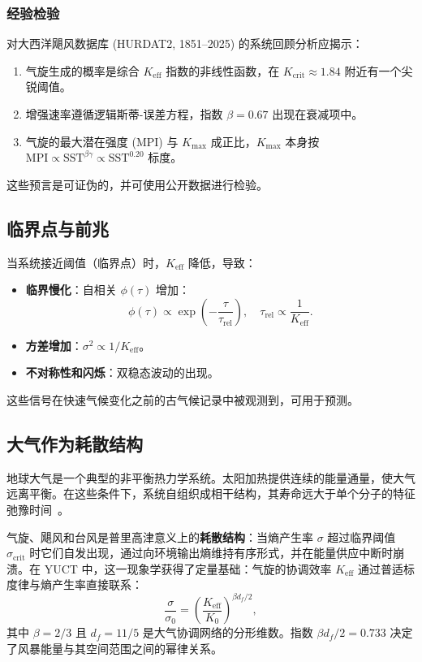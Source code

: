 \documentclass[12pt,a4paper]{article}
\newcommand{\Keff}{K_{\mathrm{eff}}}
\begin{document}
	\subsubsection*{经验检验}
	
	对大西洋飓风数据库 (HURDAT2, 1851--2025) 的系统回顾分析应揭示：
	\begin{enumerate}
		\item 气旋生成的概率是综合 $\Keff$ 指数的非线性函数，在 $K_{\mathrm{crit}} \approx 1.84$ 附近有一个尖锐阈值。
		\item 增强速率遵循逻辑斯蒂-误差方程，指数 $\beta = 0.67$ 出现在衰减项中。
		\item 气旋的最大潜在强度 (MPI) 与 $K_{\mathrm{max}}$ 成正比，$K_{\mathrm{max}}$ 本身按 $\mathrm{MPI} \propto \mathrm{SST}^{\beta\gamma} \propto \mathrm{SST}^{0.20}$ 标度。
	\end{enumerate}
	这些预言是可证伪的，并可使用公开数据进行检验。
	
	\subsection{临界点与前兆}
	
	当系统接近阈值（临界点）时，\(\Keff\) 降低，导致：
	\begin{itemize}
		\item \textbf{临界慢化}：自相关 \(\phi(\tau)\) 增加：
		\[
		\phi(\tau) \propto \exp\!\left(-\frac{\tau}{\tau_{\text{rel}}}\right),\quad \tau_{\text{rel}} \propto \frac{1}{\Keff}.
		\]
		\item \textbf{方差增加}：\(\sigma^2 \propto 1/\Keff\)。
		\item \textbf{不对称性和闪烁}：双稳态波动的出现。
	\end{itemize}
	这些信号在快速气候变化之前的古气候记录中被观测到，可用于预测。
	
	\subsection{大气作为耗散结构}
	\label{subsec:atmo_diss}
	
	地球大气是一个典型的非平衡热力学系统。太阳加热提供连续的能量通量，使大气远离平衡。在这些条件下，系统自组织成相干结构，其寿命远大于单个分子的特征弛豫时间~\cite{Prigogine1977}。
	
	气旋、飓风和台风是普里高津意义上的\textbf{耗散结构}：当熵产生率 $\sigma$ 超过临界阈值 $\sigma_{\mathrm{crit}}$ 时它们自发出现，通过向环境输出熵维持有序形式，并在能量供应中断时崩溃。在 YUCT 中，这一现象学获得了定量基础：气旋的协调效率 $\Keff$ 通过普适标度律与熵产生率直接联系：
	\begin{equation}
		\frac{\sigma}{\sigma_0} = \left( \frac{\Keff}{K_0} \right)^{\beta d_f / 2},
		\label{eq:cyclone_sigma}
	\end{equation}
	其中 $\beta = 2/3$ 且 $d_f = 11/5$ 是大气协调网络的分形维数。指数 $\beta d_f / 2 = 0.733$ 决定了风暴能量与其空间范围之间的幂律关系。
	
\end{document}
